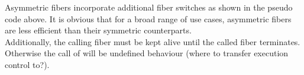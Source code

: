 Asymmetric fibers incorporate additional fiber switches as shown in the pseudo
code above. It is obvious that for a broad range of use cases, asymmetric
fibers are less efficient than their symmetric counterparts.\\
Additionally, the calling fiber must be kept alive until the called fiber
terminates. Otherwise the call of  will be undefined behaviour
(where to transfer execution control to?).\\

